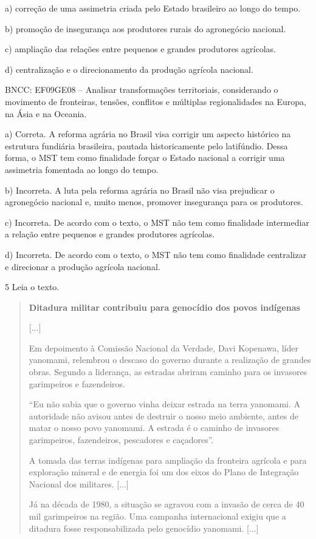a)  correção de uma assimetria criada pelo Estado brasileiro ao longo
    do tempo.

b)  promoção de insegurança aos produtores rurais do agronegócio
    nacional.

c)  ampliação das relações entre pequenos e grandes produtores
    agrícolas.

d)  centralização e o direcionamento da produção agrícola nacional.

BNCC: EF09GE08 -- Analisar transformações territoriais, considerando o movimento de fronteiras,
tensões, conflitos e múltiplas regionalidades na Europa, na Ásia e na Oceania.

a) Correta. A reforma agrária no Brasil visa corrigir um aspecto
histórico na estrutura fundiária brasileira, pautada historicamente pelo
latifúndio. Dessa forma, o MST tem como finalidade forçar o Estado
nacional a corrigir uma assimetria fomentada ao longo do tempo.

b) Incorreta. A luta pela reforma agrária no Brasil não visa prejudicar
o agronegócio nacional e, muito menos, promover insegurança
para os produtores.

c) Incorreta. De acordo com o texto, o MST não tem como finalidade
intermediar a relação entre pequenos e grandes produtores agrícolas.

d) Incorreta. De acordo com o texto, o MST não tem como finalidade
centralizar e direcionar a produção agrícola nacional.


\num{5} Leia o texto.

\begin{quote}
\textbf{Ditadura militar contribuiu para genocídio dos povos indígenas}

{[}...{]}

Em depoimento à Comissão Nacional da Verdade, Davi Kopenawa, líder
yanomami, relembrou o descaso do governo durante a realização de grandes
obras. Segundo a liderança, as estradas abriram caminho para os
invasores garimpeiros e fazendeiros.

``Eu não sabia que o governo vinha deixar estrada na terra yanomami. A
autoridade não avisou antes de destruir o nosso meio ambiente, antes
de matar o nosso povo yanomami. A estrada é o caminho de invasores
garimpeiros, fazendeiros, pescadores e caçadores''.

A tomada das terras indígenas para ampliação da fronteira agrícola e
para exploração mineral e de energia foi um dos eixos do Plano de
Integração Nacional dos militares. {[}...{]}

Já na década de 1980, a situação se agravou com a invasão de cerca de
40 mil garimpeiros na região. Uma campanha internacional exigiu que a
ditadura fosse responsabilizada pelo genocídio yanomami. {[}...{]}

\end{quote}

